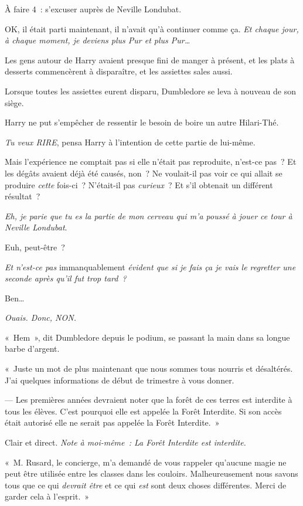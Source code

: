 À faire 4~: s'excuser auprès de Neville Londubat.

OK, il était parti maintenant, il n'avait qu'à continuer comme ça. \emph{Et chaque jour, à chaque moment, je deviens plus Pur et plus Pur…}

Les gens autour de Harry avaient presque fini de manger à présent, et les plats à desserts commencèrent à disparaître, et les assiettes sales aussi.

Lorsque toutes les assiettes eurent disparu, Dumbledore se leva à nouveau de son siège.

Harry ne put s'empêcher de ressentir le besoin de boire un autre Hilari-Thé.

\emph{Tu veux RIRE}, pensa Harry à l'intention de cette partie de lui-même.

Mais l'expérience ne comptait pas si elle n'était pas reproduite, n'est-ce pas~? Et les dégâts avaient déjà été causés, non~? Ne voulait-il pas voir ce qui allait se produire \emph{cette} fois-ci~? N'était-il pas \emph{curieux}~? Et s'il obtenait un différent résultat~?

\emph{Eh, je parie que tu es la partie de mon cerveau qui m'a poussé à jouer ce tour à Neville Londubat}.

Euh, peut-être~?

\emph{Et n'est-ce pas} immanquablement \emph{évident que si je fais ça je vais le regretter une seconde après qu'il fut trop tard~?}

Ben…

\emph{Ouais. Donc, NON.}

«~Hem~», dit Dumbledore depuis le podium, se passant la main dans sa longue barbe d'argent.

«~Juste un mot de plus maintenant que nous sommes tous nourris et désaltérés. J'ai quelques informations de début de trimestre à vous donner.

--- Les premières années devraient noter que la forêt de ces terres est interdite à tous les élèves. C'est pourquoi elle est appelée la Forêt Interdite. Si son accès était autorisé elle ne serait pas appelée la Forêt Interdite.~»

Clair et direct. \emph{Note à moi-même~: La Forêt Interdite est interdite.}

«~M. Rusard, le concierge, m'a demandé de vous rappeler qu'aucune magie ne peut être utilisée entre les classes dans les couloirs. Malheureusement nous savons tous que ce qui \emph{devrait être} et ce qui \emph{est} sont deux choses différentes. Merci de garder cela à l'esprit.~»


